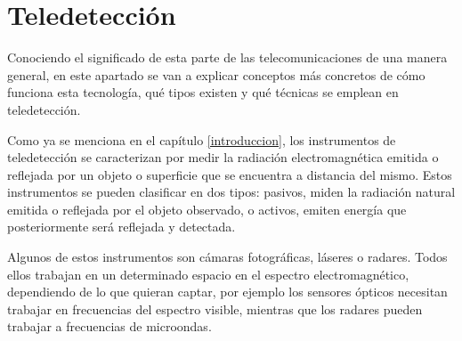 \section{Teledetección}
\par Conociendo el significado de esta parte de las telecomunicaciones de una manera general, en este apartado se van a explicar conceptos más concretos de cómo funciona esta tecnología, qué tipos existen y qué técnicas se emplean en teledetección. 
\\
\par Como ya se menciona en el capítulo \ref{introduccion}, los instrumentos de teledetección se caracterizan por medir la radiación electromagnética emitida o reflejada por un objeto o superficie que se encuentra a distancia del mismo. Estos instrumentos se pueden clasificar en dos tipos: pasivos, miden la radiación natural emitida o reflejada por el objeto observado, o activos, emiten energía que posteriormente será reflejada y detectada.
\\
\par Algunos de estos instrumentos son cámaras fotográficas, láseres o radares. Todos ellos trabajan en un determinado espacio en el espectro electromagnético, dependiendo de lo que quieran captar, por ejemplo los sensores ópticos necesitan trabajar en frecuencias del espectro visible, mientras que los radares pueden trabajar a frecuencias de microondas.
